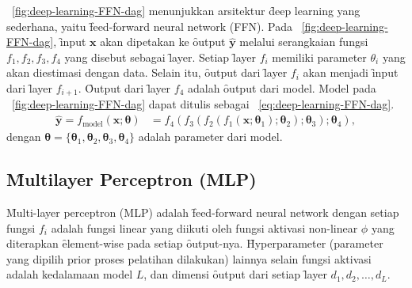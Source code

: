     \pic~\ref{fig:deep-learning-FFN-dag} menunjukkan arsitektur \f{deep learning} yang sederhana, yaitu \f{feed-forward neural network} (FFN). Pada \pic~\ref{fig:deep-learning-FFN-dag}, \f{input} $\mathbf{x}$ akan dipetakan ke \f{output} $\mathbf{\hat y}$ melalui serangkaian fungsi $f_1, f_2, f_3,f_4$ yang disebut sebagai \f{layer}. Setiap \f{layer} $f_i$ memiliki parameter $\theta_i$ yang akan diestimasi dengan data. Selain itu, \f{output} dari \f{layer} $f_i$ akan menjadi \f{input} dari \f{layer} $f_{i+1}$. \f{Output} dari \f{layer} $f_4$ adalah \f{output} dari model. Model pada \pic~\ref{fig:deep-learning-FFN-dag} dapat ditulis sebagai \equ~\ref{eq:deep-learning-FFN-dag}.
    \begin{align}
        \label{eq:deep-learning-FFN-dag}
        \mathbf{\hat y} = f_{\text{model}}(\mathbf{x}; \bm{\theta}) &= f_4(f_3(f_2(f_1(\mathbf{x}; \bm{\theta}_1); \bm{\theta}_2); \bm{\theta}_3); \bm{\theta}_4),
    \end{align}
    dengan $\bm{\theta} = \{\bm{\theta}_1, \bm{\theta}_2, \bm{\theta}_3, \bm{\theta}_4\}$ adalah parameter dari model.

    \subsection{\f{Multilayer Perceptron} (MLP)}

    \f{Multi-layer perceptron} (MLP) adalah \f{feed-forward neural network} dengan setiap fungsi $f_i$ adalah fungsi linear yang diikuti oleh fungsi aktivasi non-linear $\phi$  yang diterapkan \f{element-wise} pada setiap \f{output}-nya. \f{Hyperparameter} (parameter yang dipilih prior proses pelatihan dilakukan) lainnya selain fungsi aktivasi adalah kedalamaan model $L$, dan dimensi \f{output} dari setiap \f{layer} $d_1, d_2, \dots, d_L$.

